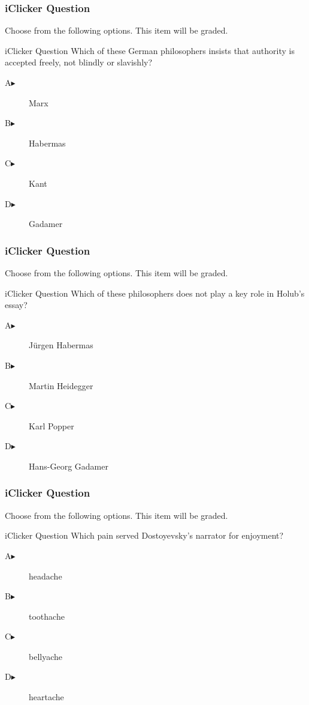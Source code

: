 \documentclass[xcolor=dvipsnames]{beamer}
\begin{document}
\begin{frame}
  \frametitle{iClicker Question}
Choose from the following options. This item will be graded.
\begin{block}{iClicker Question}
  Which of these German philosophers insists that authority is
  accepted freely, not blindly or slavishly?
\end{block}
\begin{description}
\item[A\hspace{.2in}$\blacktriangleright$] Marx
\item[B\hspace{.2in}$\blacktriangleright$] Habermas
\item[C\hspace{.2in}$\blacktriangleright$] Kant
\item[D\hspace{.2in}$\blacktriangleright$] Gadamer
\end{description}
\end{frame}

\begin{frame}
  \frametitle{iClicker Question}
Choose from the following options. This item will be graded.
\begin{block}{iClicker Question}
Which of these philosophers does not play a key role in Holub's essay?
\end{block}
\begin{description}
\item[A\hspace{.2in}$\blacktriangleright$] J{\"u}rgen Habermas
\item[B\hspace{.2in}$\blacktriangleright$] Martin Heidegger
\item[C\hspace{.2in}$\blacktriangleright$] Karl Popper
\item[D\hspace{.2in}$\blacktriangleright$] Hans-Georg Gadamer
\end{description}
\end{frame}

\begin{frame}
  \frametitle{iClicker Question}
Choose from the following options. This item will be graded.
\begin{block}{iClicker Question}
Which pain served Dostoyevsky's narrator for enjoyment?
\end{block}
\begin{description}
\item[A\hspace{.2in}$\blacktriangleright$] headache
\item[B\hspace{.2in}$\blacktriangleright$] toothache
\item[C\hspace{.2in}$\blacktriangleright$] bellyache
\item[D\hspace{.2in}$\blacktriangleright$] heartache
\end{description}
\end{frame}
\end{document}
